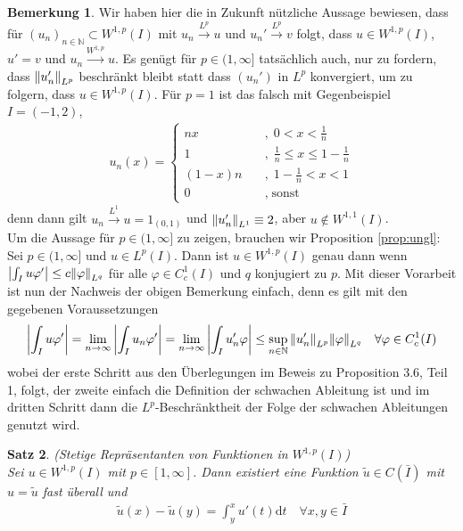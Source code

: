 \documentclass[twoside]{article}
\newcounter{lecnum}
\newtheorem{theorem}{Satz}[lecnum]
\theoremstyle{definition}
\newtheorem{remark}[theorem]{Bemerkung}
\begin{document}
\begin{remark} \label{bem:konv}
Wir haben hier die in Zukunft nützliche Aussage bewiesen, dass für $(u_n)_{n \in \mathbb{N}} \subset W^{1,p}(I)$ mit $u_n \xrightarrow{L^p} u$ und $u_n' \xrightarrow{L^p} v$ folgt, dass $u \in W^{1,p}(I)$, $u' = v$ und $u_n \xrightarrow{W^{1,p}} u$. Es genügt für $p \in (1,\infty]$ tatsächlich auch, nur zu fordern, dass $\norm{u_n'}_{L^p}$ beschränkt bleibt statt dass $(u_n')$ in $L^p$ konvergiert, um zu folgern, dass $u \in W^{1,p}(I)$. Für $p=1$ ist das falsch mit Gegenbeispiel $I=(-1,2)$, 
\begin{align*}
u_n(x) = \begin{cases}
nx \quad&, \; 0 < x < \frac{1}{n}\\
1 \quad&, \; \frac{1}{n}\leq x \leq 1- \frac{1}{n}\\
(1-x)n \quad&, \; 1-\frac{1}{n} < x < 1\\
0 \quad&, \; \text{sonst}
\end{cases}
\end{align*}
denn dann gilt $u_n \xrightarrow{L^1} u = 1_{(0,1)}$ und $\norm{u_n'}_{L^1} \equiv 2$, aber $u \not \in W^{1,1}(I)$. 
\\Um die Aussage für $p \in (1,\infty]$ zu zeigen, brauchen wir Proposition \ref{prop:ungl}: Sei $p \in (1,\infty]$ und $u \in L^p(I)$. Dann ist $u \in W^{1,p}(I)$ genau dann wenn $\abs{\int_I u \varphi'} \leq c \norm{\varphi}_{L^q}$ für alle $\varphi \in C_c^1(I)$ und $q$ konjugiert zu $p$.
Mit dieser Vorarbeit ist nun der Nachweis der obigen Bemerkung einfach, denn es gilt mit den gegebenen Voraussetzungen
\begin{align*}
\abs{\int_I u \varphi '} = \lim_{n \to \infty} \abs{\int_I u_n \varphi'} = \lim_{n \to \infty} \abs{\int_I u_n' \varphi} \leq \sup_{n \in \mathbb{N}} \norm{u_n'}_{L^p} \norm{\varphi}_{L^q} \quad \forall \varphi \in C_c^1(I)
\end{align*}
wobei der erste Schritt aus den Überlegungen im Beweis zu Proposition 3.6, Teil 1, folgt, der zweite einfach die Definition der schwachen Ableitung ist und im dritten Schritt dann die $L^p$-Beschränktheit der Folge der schwachen Ableitungen genutzt wird.
\end{remark}
\begin{theorem} (Stetige Repräsentanten von Funktionen in $W^{1,p}(I)$) \label{thm:stetig}\\
Sei $u \in W^{1,p}(I)$ mit $p \in [1,\infty]$. Dann existiert eine Funktion $\tilde{u} \in C(\bar{I})$ mit $u = \tilde{u}$ fast überall und 
\begin{align*}
\tilde{u}(x) - \tilde{u}(y) = \int_{y}^x u'(t) \mathrm{d}t \quad \forall x,y \in \bar{I}
\end{align*}
\end{theorem}
\end{document}
